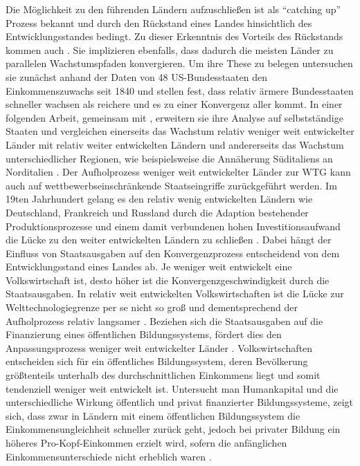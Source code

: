 Die M{\"o}glichkeit zu den f{\"u}hrenden L{\"a}ndern aufzuschlie{\ss}en ist als "`catching up"' Prozess bekannt und durch den R{\"u}ckstand eines Landes hinsichtlich des Entwicklungsstandes bedingt. Zu dieser Erkenntnis des Vorteils des R{\"u}ckstands kommen auch \citet{Barro.1990,Barro.1991,Barro.1992}. Sie implizieren ebenfalls, dass dadurch die meisten L{\"a}nder zu parallelen Wachstumspfaden konvergieren. Um ihre These zu belegen untersuchen sie zun{\"a}chst anhand der Daten von 48 US-Bundesstaaten den Einkommenszuwachs seit 1840 und stellen fest, dass relativ {\"a}rmere Bundesstaaten schneller wachsen als reichere und es zu einer Konvergenz aller kommt. In einer folgenden Arbeit, gemeinsam mit \citet{Blanchard.1989}, erweitern sie ihre Analyse auf selbstst{\"a}ndige Staaten und vergleichen einerseits das Wachstum relativ weniger weit entwickelter L{\"a}nder mit relativ weiter entwickelten L{\"a}ndern und andererseits das Wachstum unterschiedlicher Regionen, wie beispielsweise die Ann{\"a}herung S{\"u}ditaliens an Norditalien \citep{Barro.1992}.\newline
Der Aufholprozess weniger weit entwickelter L{\"a}nder zur WTG kann auch auf wettbewerbseinschr{\"a}nkende Staatseingriffe zur{\"u}ckgef{\"u}hrt werden. Im 19ten Jahrhundert gelang es den relativ wenig entwickelten L{\"a}ndern wie Deutschland, Frankreich und Russland durch die Adaption bestehender Produktionsprozesse und einem damit verbundenen hohen Investitionsaufwand die L{\"u}cke zu den weiter entwickelten L{\"a}ndern zu schlie{\ss}en \citep{Gerschenkron.1962}. Dabei h{\"a}ngt der Einfluss von Staatsausgaben auf den Konvergenzprozess entscheidend von dem Entwicklungsstand eines Landes ab. Je weniger weit entwickelt eine Volkswirtschaft ist, desto h{\"o}her ist die Konvergenzgeschwindigkeit durch die Staatsausgaben. In relativ weit entwickelten Volkswirtschaften ist die L{\"u}cke zur Welttechnologiegrenze per se nicht so gro{\ss} und dementsprechend der Aufholprozess relativ langsamer \citep{Ott.2011}. 
Beziehen sich die Staatsausgaben auf die Finanzierung eines {\"o}ffentlichen Bildungssystems, f{\"o}rdert dies den Anpassungsprozess weniger weit entwickelter L{\"a}nder \citep{Glomm.1992}. Volkswirtschaften entscheiden sich f{\"u}r ein {\"o}ffentliches Bildungssystem, deren Bev{\"o}lkerung gr{\"o}{\ss}tenteils unterhalb des durchschnittlichen Einkommens liegt und somit tendenziell weniger weit entwickelt ist.
Untersucht man Humankapital und die unterschiedliche Wirkung {\"o}ffentlich und privat finanzierter Bildungssysteme, zeigt sich, dass zwar in L{\"a}ndern mit einem {\"o}ffentlichen Bildungssystem die Einkommensungleichheit schneller zur{\"u}ck geht, jedoch bei privater Bildung ein h{\"o}heres Pro-Kopf-Einkommen erzielt wird, sofern die anf{\"a}nglichen Einkommensunterschiede nicht erheblich waren \citep{Glomm.1992}.\\


